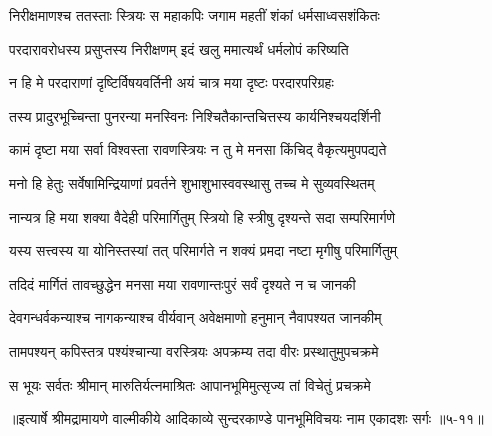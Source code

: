 \twolineshloka
{निरीक्षमाणश्च ततस्ताः स्त्रियः स महाकपिः}
{जगाम महतीं शंकां धर्मसाध्वसशंकितः} %

\twolineshloka
{परदारावरोधस्य प्रसुप्तस्य निरीक्षणम्}
{इदं खलु ममात्यर्थं धर्मलोपं करिष्यति} %

\twolineshloka
{न हि मे परदाराणां दृष्टिर्विषयवर्तिनी}
{अयं चात्र मया दृष्टः परदारपरिग्रहः} %

\twolineshloka
{तस्य प्रादुरभूच्चिन्ता पुनरन्या मनस्विनः}
{निश्चितैकान्तचित्तस्य कार्यनिश्चयदर्शिनी} %

\twolineshloka
{कामं दृष्टा मया सर्वा विश्वस्ता रावणस्त्रियः}
{न तु मे मनसा किंचिद् वैकृत्यमुपपद्यते} %

\twolineshloka
{मनो हि हेतुः सर्वेषामिन्द्रियाणां प्रवर्तने}
{शुभाशुभास्ववस्थासु तच्च मे सुव्यवस्थितम्} %

\twolineshloka
{नान्यत्र हि मया शक्या वैदेही परिमार्गितुम्}
{स्त्रियो हि स्त्रीषु दृश्यन्ते सदा सम्परिमार्गणे} %

\twolineshloka
{यस्य सत्त्वस्य या योनिस्तस्यां तत् परिमार्गते}
{न शक्यं प्रमदा नष्टा मृगीषु परिमार्गितुम्} %

\twolineshloka
{तदिदं मार्गितं तावच्छुद्धेन मनसा मया}
{रावणान्तःपुरं सर्वं दृश्यते न च जानकी} %

\twolineshloka
{देवगन्धर्वकन्याश्च नागकन्याश्च वीर्यवान्}
{अवेक्षमाणो हनुमान् नैवापश्यत जानकीम्} %

\twolineshloka
{तामपश्यन् कपिस्तत्र पश्यंश्चान्या वरस्त्रियः}
{अपक्रम्य तदा वीरः प्रस्थातुमुपचक्रमे} %

\twolineshloka
{स भूयः सर्वतः श्रीमान् मारुतिर्यत्नमाश्रितः}
{आपानभूमिमुत्सृज्य तां विचेतुं प्रचक्रमे} %


॥इत्यार्षे श्रीमद्रामायणे वाल्मीकीये आदिकाव्ये सुन्दरकाण्डे पानभूमिविचयः नाम एकादशः सर्गः ॥५-११॥
